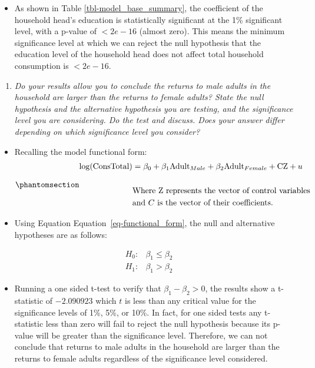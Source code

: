 \documentclass[
  letterpaper,
  DIV=11,
  numbers=noendperiod]{scrartcl}
\providecommand{\tightlist}{%
  \setlength{\itemsep}{0pt}\setlength{\parskip}{0pt}}
\begin{document}
\begin{itemize}
\tightlist
\item
  As shown in Table \ref{tbl-model_base_summary}, the coefficient of the
  household head's education is statistically significant at the 1\%
  significant level, with a p-value of \(<2e-16\) (almost zero). This
  means the minimum significance level at which we can reject the null
  hypothesis that the education level of the household head does not
  affect total household consumption is \(<2e-16\).
\end{itemize}

\begin{enumerate}
\def\labelenumi{\arabic{enumi}.}
\setcounter{enumi}{1}
\tightlist
\item
  \emph{Do your results allow you to conclude the returns to male adults
  in the household are larger than the returns to female adults? State
  the null hypothesis and the alternative hypothesis you are testing,
  and the significance level you are considering. Do the test and
  discuss. Does your answer differ depending on which significance level
  you consider?}
\end{enumerate}

\begin{itemize}
\item
  Recalling the model functional form:
  \begin{equation}\protect\phantomsection\label{eq-functional_form}{
  \begin{aligned}
  \log(\text{ConsTotal}) & = \beta_0 + \beta_1 \text{Adult}_{Male} + \beta_2 \text{Adult}_{Female} + \text{C} \text{Z} + u\\\\
  & \text{Where } \text{Z} \text{ represents the vector of control variables}\\& \text{and } C \text{ is the vector of their coefficients.} 
  \end{aligned}
  }\end{equation}
\item
  Using Equation Equation~\ref{eq-functional_form}, the null and
  alternative hypotheses are as follows:
\end{itemize}

\[
\begin{aligned}
H_0: & \beta_1 \leq \beta_2 \\
H_1: & \beta_1 > \beta_2
\end{aligned}
\]

\begin{itemize}
\tightlist
\item
  Running a one sided t-test to verify that \(\beta_1 - \beta_2 > 0\),
  the results show a t-statistic of \(-2.090923\) which \(t\) is less
  than any critical value for the significance levels of 1\%, 5\%, or
  10\%. In fact, for one sided tests any t-statistic less than zero will
  fail to reject the null hypothesis because its p-value will be greater
  than the significance level. Therefore, we can not conclude that
  returns to male adults in the household are larger than the returns to
  female adults regardless of the significance level considered.
\end{itemize}
\end{document}
